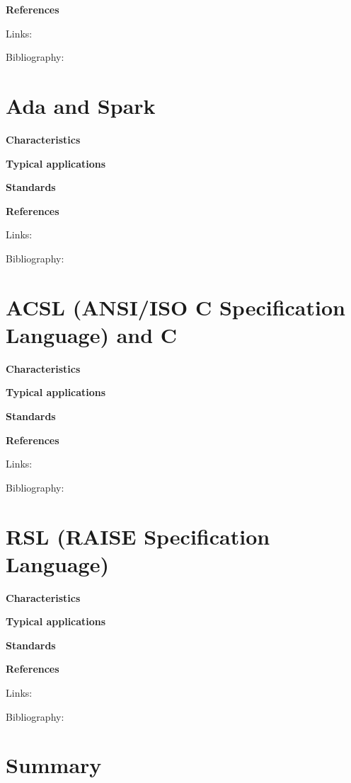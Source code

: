 \documentclass{./template/openetcs_report}
\begin{document}
	\textbf{References}

Links:



Bibliography:

\section{Ada and Spark}


	\textbf{Characteristics}


	\textbf{Typical applications}


	\textbf{Standards}


	\textbf{References}

Links:



Bibliography:

\section{ACSL (ANSI/ISO C Specification Language) and C}


	\textbf{Characteristics}


	\textbf{Typical applications}


	\textbf{Standards}


	\textbf{References}

Links:



Bibliography:

\section {RSL (RAISE Specification Language)}


	\textbf{Characteristics}


	\textbf{Typical applications}


	\textbf{Standards}


	\textbf{References}

Links:



Bibliography:


\section{Summary}
\end{document}
